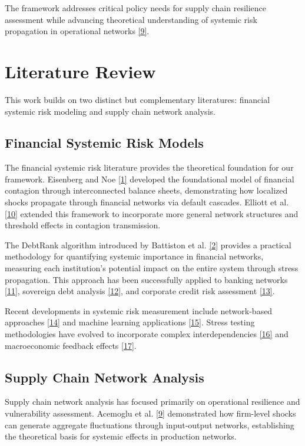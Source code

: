 \documentclass[a4 paper, 11pt,twoside]{article}
\newcommand{\0}{\Bf{0}}
\theoremstyle{definition}
\begin{document}
The framework addresses critical policy needs for supply chain resilience assessment while advancing theoretical understanding of systemic risk propagation in operational networks \hyperref[ref9]{[9]}.

\section{Literature Review}

This work builds on two distinct but complementary literatures: financial systemic risk modeling and supply chain network analysis.

\subsection{Financial Systemic Risk Models}

The financial systemic risk literature provides the theoretical foundation for our framework. Eisenberg and Noe \hyperref[ref1]{[1]} developed the foundational model of financial contagion through interconnected balance sheets, demonstrating how localized shocks propagate through financial networks via default cascades. Elliott et al. \hyperref[ref10]{[10]} extended this framework to incorporate more general network structures and threshold effects in contagion transmission.

The DebtRank algorithm introduced by Battiston et al. \hyperref[ref2]{[2]} provides a practical methodology for quantifying systemic importance in financial networks, measuring each institution's potential impact on the entire system through stress propagation. This approach has been successfully applied to banking networks \hyperref[ref11]{[11]}, sovereign debt analysis \hyperref[ref12]{[12]}, and corporate credit risk assessment \hyperref[ref13]{[13]}.

Recent developments in systemic risk measurement include network-based approaches \hyperref[ref14]{[14]} and machine learning applications \hyperref[ref15]{[15]}. Stress testing methodologies have evolved to incorporate complex interdependencies \hyperref[ref16]{[16]} and macroeconomic feedback effects \hyperref[ref17]{[17]}.

\subsection{Supply Chain Network Analysis}

Supply chain network analysis has focused primarily on operational resilience and vulnerability assessment. Acemoglu et al. \hyperref[ref9]{[9]} demonstrated how firm-level shocks can generate aggregate fluctuations through input-output networks, establishing the theoretical basis for systemic effects in production networks.
\end{document}

